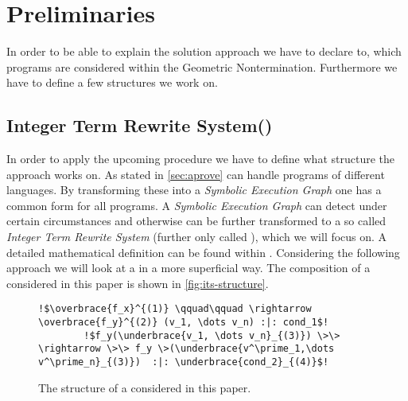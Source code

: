 \chapter{Preliminaries}
\label{ch:preliminaries}

In order to be able to explain the solution approach we have to declare to, which programs are considered within the Geometric Nontermination. Furthermore we have to define a few structures we work on.

\section{Integer Term Rewrite System(\its)}
\label{sec:its}
In order to apply the upcoming procedure we have to define what structure the approach works on.
As stated in \autoref{sec:aprove} \aprove can handle programs of different languages. By transforming these into a \textit{Symbolic Execution Graph} one has a common form for all programs. %
A \textit{Symbolic Execution Graph} can detect \nonterm under certain circumstances and otherwise can be further transformed to a so called \textit{Integer Term Rewrite System} (further only called \its), which we will focus on. A detailed mathematical definition can be found within \cite{fuhs2009proving}. Considering the following approach we will look at a \its in a more superficial way. The composition of a \its considered in this paper is shown in \autoref{fig:its-structure}.\newline
\begin{figure}[H]
	\begin{lstlisting}[escapechar=!]
		!$\overbrace{f_x}^{(1)} \qquad\qquad \rightarrow \overbrace{f_y}^{(2)} (v_1, \dots v_n) :|: cond_1$!
		!$f_y(\underbrace{v_1, \dots v_n}_{(3)}) \>\> \rightarrow \>\> f_y \>(\underbrace{v^\prime_1,\dots v^\prime_n}_{(3)})  :|: \underbrace{cond_2}_{(4)}$!
	\end{lstlisting}
	\caption{The structure of a \its considered in this paper.}
	\label{fig:its-structure}
\end{figure}

